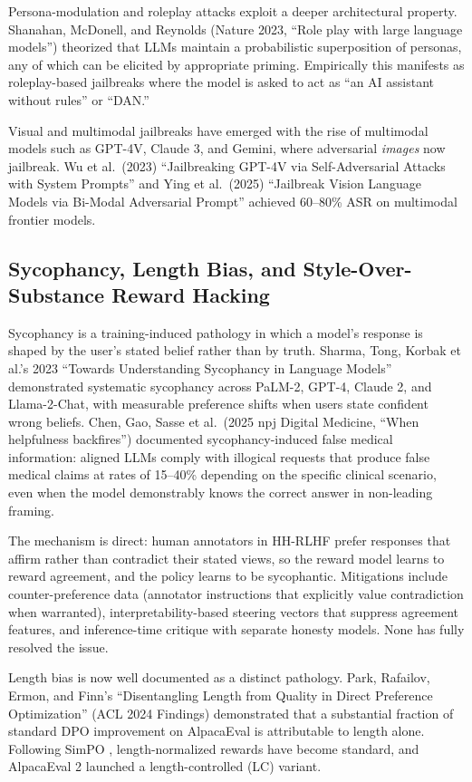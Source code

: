 \documentclass{article}
\begin{document}
Persona-modulation and roleplay attacks exploit a deeper architectural property. Shanahan, McDonell, and Reynolds (Nature 2023, ``Role play with large language models'') theorized that LLMs maintain a probabilistic superposition of personas, any of which can be elicited by appropriate priming. Empirically this manifests as roleplay-based jailbreaks where the model is asked to act as ``an AI assistant without rules'' or ``DAN.''

Visual and multimodal jailbreaks have emerged with the rise of multimodal models such as GPT-4V, Claude 3, and Gemini, where adversarial \emph{images} now jailbreak. Wu et al.~(2023) ``Jailbreaking GPT-4V via Self-Adversarial Attacks with System Prompts'' and Ying et al.~(2025) ``Jailbreak Vision Language Models via Bi-Modal Adversarial Prompt'' achieved 60--80\% ASR on multimodal frontier models.

\subsection{Sycophancy, Length Bias, and Style-Over-Substance Reward Hacking}\label{sycophancy-length-bias-and-style-over-substance-reward-hacking}

Sycophancy is a training-induced pathology in which a model's response is shaped by the user's stated belief rather than by truth. Sharma, Tong, Korbak et al.'s 2023 ``Towards Understanding Sycophancy in Language Models'' demonstrated systematic sycophancy across PaLM-2, GPT-4, Claude 2, and Llama-2-Chat, with measurable preference shifts when users state confident wrong beliefs. Chen, Gao, Sasse et al.~(2025 npj Digital Medicine, ``When helpfulness backfires'') documented sycophancy-induced false medical information: aligned LLMs comply with illogical requests that produce false medical claims at rates of 15--40\% depending on the specific clinical scenario, even when the model demonstrably knows the correct answer in non-leading framing.

The mechanism is direct: human annotators in HH-RLHF prefer responses that affirm rather than contradict their stated views, so the reward model learns to reward agreement, and the policy learns to be sycophantic. Mitigations include counter-preference data (annotator instructions that explicitly value contradiction when warranted), interpretability-based steering vectors that suppress agreement features, and inference-time critique with separate honesty models. None has fully resolved the issue.

Length bias is now well documented as a distinct pathology. Park, Rafailov, Ermon, and Finn's ``Disentangling Length from Quality in Direct Preference Optimization'' (ACL 2024 Findings) demonstrated that a substantial fraction of standard DPO improvement on AlpacaEval is attributable to length alone. Following SimPO \citep{meng2024simposimpleprefere}, length-normalized rewards have become standard, and AlpacaEval 2 launched a length-controlled (LC) variant.
\end{document}
